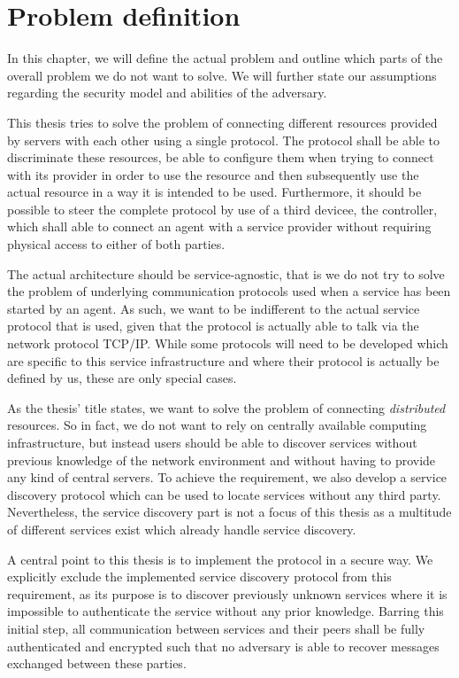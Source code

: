 \section{Problem definition}

In this chapter, we will define the actual problem and outline which parts of the overall problem we do not want to solve.
We will further state our assumptions regarding the security model and abilities of the adversary.

This thesis tries to solve the problem of connecting different resources provided by servers with each other using a single protocol.
The protocol shall be able to discriminate these resources, be able to configure them when trying to connect with its provider in order to use the resource and then subsequently use the actual resource in a way it is intended to be used.
Furthermore, it should be possible to steer the complete protocol by use of a third devicee, the controller, which shall able to connect an agent with a service provider without requiring physical access to either of both parties.

The actual architecture should be service-agnostic, that is we do not try to solve the problem of underlying communication protocols used when a service has been started by an agent.
As such, we want to be indifferent to the actual service protocol that is used, given that the protocol is actually able to talk via the network protocol TCP/IP.
While some protocols will need to be developed which are specific to this service infrastructure and where their protocol is actually be defined by us, these are only special cases.

As the thesis' title states, we want to solve the problem of connecting \emph{distributed} resources.
So in fact, we do not want to rely on centrally available computing infrastructure, but instead users should be able to discover services without previous knowledge of the network environment and without having to provide any kind of central servers.
To achieve the requirement, we also develop a service discovery protocol which can be used to locate services without any third party.
Nevertheless, the service discovery part is not a focus of this thesis as a multitude of different services exist which already handle service discovery.

A central point to this thesis is to implement the protocol in a secure way.
We explicitly exclude the implemented service discovery protocol from this requirement, as its purpose is to discover previously unknown services where it is impossible to authenticate the service without any prior knowledge.
Barring this initial step, all communication between services and their peers shall be fully authenticated and encrypted such that no adversary is able to recover messages exchanged between these parties.

